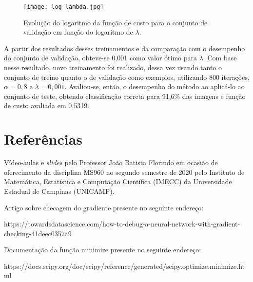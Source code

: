 \documentclass[12pt]{article}
\begin{document}
\begin{figure}
\begin{center}
\texttt{[image: log\_lambda.jpg]}
\caption{Evolução do logaritmo da função de custo para o conjunto de validação em função do logaritmo de $\lambda$.} \label{log_lambda}
\end{center}
\end{figure}

A partir dos resultados desses treinamentos e da comparação com o desempenho do conjunto de validação, obteve-se 0,001 como valor ótimo para $\lambda$. Com base nesse resultado, novo treinamento foi realizado, dessa vez usando tanto o conjunto de treino quanto o de validação como exemplos, utilizando 800 iterações, $\alpha=0,8$ e $\lambda=0,001$. Avaliou-se, então, o desempenho do método ao aplicá-lo ao conjunto de teste, obtendo classificação correta para 91,6\% das imagens e função de custo avaliada em 0,5319.


\section{Referências}
Vídeo-aulas e \textit{slides} pelo Professor João Batista Florindo em ocasião de oferecimento da disciplina MS960 no segundo semestre de 2020 pelo Instituto de Matemática, Estatística e Computação Científica (IMECC) da Universidade Estadual de Campinas (UNICAMP).

Artigo sobre checagem do gradiente presente no seguinte endereço:

https://towardsdatascience.com/how-to-debug-a-neural-network-with-gradient-checking-41deec0357a9

Documentação da função minimize presente no seguinte endereço:

https://docs.scipy.org/doc/scipy/reference/generated/scipy.optimize.minimize.html
\end{document}

